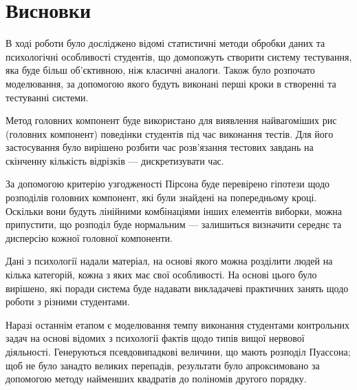 \chapter*{Висновки}

В ході роботи було досліджено відомі статистичні методи обробки даних
та психологічні особливості студентів, що домопожуть створити систему
тестування, яка буде більш об’єктивною, ніж класичні аналоги.
Також було розпочато моделювання, за допомогою якого будуть виконані
перші кроки в створенні та тестуванні системи.

Метод головних компонент буде використано для виявлення найвагоміших
рис (головних компонент) поведінки студентів під час виконання тестів.
Для його застосування було вирішено розбити час розв’язання тестових завдань
на скінченну кількість відрізків --- дискретизувати час.

За допомогою критерію узгодженості Пірсона буде перевірено гіпотези щодо
розподілів головних компонент, які були знайдені на попередньому кроці.
Оскільки вони будуть лінійними комбінаціями інших елементів виборки, можна
припустити, що розподіл буде нормальним --- залишиться визначити середнє
та дисперсію кожної головної компоненти.

Дані з психології надали матеріал, на основі якого можна розділити людей
на кілька категорій, кожна з яких має свої особливості.
На основі цього було вирішено, які поради система буде надавати викладачеві
практичних занять щодо роботи з різними студентами.

Наразі останнім етапом є моделювання темпу виконання студентами контрольних
задач на основі відомих з психології фактів щодо типів вищої нервової
діяльності.
Генеруються псевдовипадкові величини, що мають розподіл Пуассона;
щоб не було занадто великих перепадів, результати було апроксимовано за
допомогою методу найменших квадратів до поліномів другого порядку.
